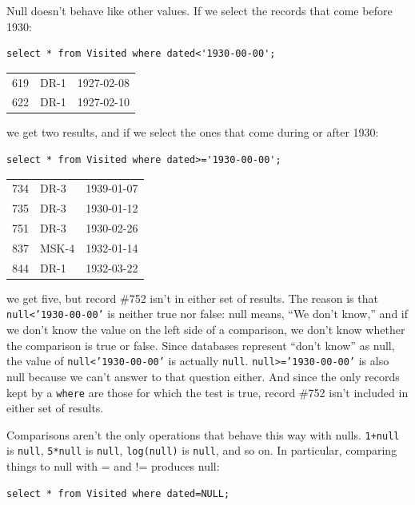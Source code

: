\documentclass{book}
\begin{document}
Null doesn't behave like other values. If we select the records that
come before 1930:

\begin{verbatim}
select * from Visited where dated<'1930-00-00';
\end{verbatim}

\begin{tabular}{lll}
619 & DR-1 & 1927-02-08 \\
622 & DR-1 & 1927-02-10 \\
\end{tabular}

we get two results, and if we select the ones that come during or after
1930:

\begin{verbatim}
select * from Visited where dated>='1930-00-00';
\end{verbatim}

\begin{tabular}{lll}
734 & DR-3 & 1939-01-07 \\
735 & DR-3 & 1930-01-12 \\
751 & DR-3 & 1930-02-26 \\
837 & MSK-4 & 1932-01-14 \\
844 & DR-1 & 1932-03-22 \\
\end{tabular}

we get five, but record \#752 isn't in either set of results. The reason
is that \texttt{null\textless{}'1930-00-00'} is neither true nor false:
null means, ``We don't know,'' and if we don't know the value on the
left side of a comparison, we don't know whether the comparison is true
or false. Since databases represent ``don't know'' as null, the value of
\texttt{null\textless{}'1930-00-00'} is actually \texttt{null}.
\texttt{null\textgreater{}='1930-00-00'} is also null because we can't
answer to that question either. And since the only records kept by a
\texttt{where} are those for which the test is true, record \#752 isn't
included in either set of results.

Comparisons aren't the only operations that behave this way with nulls.
\texttt{1+null} is \texttt{null}, \texttt{5*null} is \texttt{null},
\texttt{log(null)} is \texttt{null}, and so on. In particular, comparing
things to null with = and != produces null:

\begin{verbatim}
select * from Visited where dated=NULL;
\end{verbatim}
\end{document}
